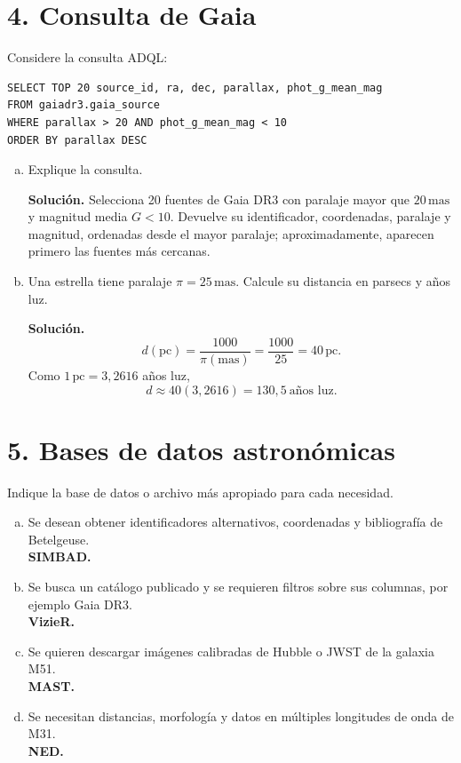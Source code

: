 \documentclass[a4paper,11pt]{article}
\newcommand{\respuesta}[1]{\par\textcolor{blue!60!black}{\textbf{Solución.}} #1}
\newcommand{\correcta}[1]{\textcolor{red!70!black}{\textbf{#1}}}
\begin{document}
\section*{4. Consulta de Gaia}

Considere la consulta ADQL:

\begin{verbatim}
SELECT TOP 20 source_id, ra, dec, parallax, phot_g_mean_mag
FROM gaiadr3.gaia_source
WHERE parallax > 20 AND phot_g_mean_mag < 10
ORDER BY parallax DESC
\end{verbatim}

\begin{enumerate}[a)]
    \item Explique la consulta.

    \respuesta{Selecciona 20 fuentes de Gaia DR3 con paralaje mayor que $20\,\mathrm{mas}$ y magnitud media $G<10$. Devuelve su identificador, coordenadas, paralaje y magnitud, ordenadas desde el mayor paralaje; aproximadamente, aparecen primero las fuentes más cercanas.}

    \item Una estrella tiene paralaje $\pi=25\,\mathrm{mas}$. Calcule su distancia en parsecs y años luz.

    \respuesta{
    \[
        d(\mathrm{pc})=\frac{1000}{\pi(\mathrm{mas})}
        =\frac{1000}{25}=40\,\mathrm{pc}.
    \]
    Como $1\,\mathrm{pc}=3{,}2616$ años luz,
    \[
        d\approx40(3{,}2616)=130{,}5\ \text{años luz}.
    \]}
\end{enumerate}

\section*{5. Bases de datos astronómicas}

Indique la base de datos o archivo más apropiado para cada necesidad.

\begin{enumerate}[a)]
    \item Se desean obtener identificadores alternativos, coordenadas y bibliografía de Betelgeuse.\\
    \correcta{SIMBAD.}

    \item Se busca un catálogo publicado y se requieren filtros sobre sus columnas, por ejemplo Gaia DR3.\\
    \correcta{VizieR.}

    \item Se quieren descargar imágenes calibradas de Hubble o JWST de la galaxia M51.\\
    \correcta{MAST.}

    \item Se necesitan distancias, morfología y datos en múltiples longitudes de onda de M31.\\
    \correcta{NED.}
\end{enumerate}
\end{document}
